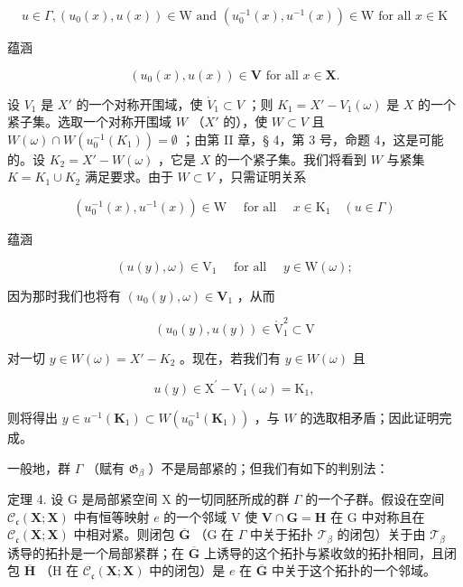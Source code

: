 \[
u \in \Gamma , (u _ {0} (x), u (x)) \in \mathrm{W} \text {   and   } (u _ {0} ^ {- 1} (x), u ^ {- 1} (x)) \in \mathrm{W} \text {   for   all   } x \in \mathrm{K}
\]

蕴涵

\[
(u _ {0} (x), u (x)) \in \mathbf {V} \text {   for   all   } x \in \mathbf {X}.
\]

设 \(V_1\) 是 \(X'\) 的一个对称开围域，使 \(\dot{V}_1 \subset V\) ；则 \(K_1 = X' - V_1(\omega)\) 是 \(X\) 的一个紧子集。选取一个对称开围域 \(W\) （\(X'\) 的），使 \(W \subset V\) 且 \(W(\omega) \cap W(u_0^{-1}(K_1)) = \emptyset\) ；由第 II 章，§ 4，第 3 号，命题 4，这是可能的。设 \(K_2 = X' - W(\omega)\) ，它是 \(X\) 的一个紧子集。我们将看到 \(W\) 与紧集 \(K = K_1 \cup K_2\) 满足要求。由于 \(W \subset V\) ，只需证明关系

\[
\left(u _ {0} ^ {- 1} (x), u ^ {- 1} (x)\right) \in \mathrm{W} \quad \text { for   all } \quad x \in \mathrm{K} _ {1} \quad (u \in \Gamma)
\]

蕴涵

\[
(u (y), \omega) \in \mathrm{V} _ {1} \quad \text { for   all } \quad y \in \mathrm{W} (\omega);
\]

因为那时我们也将有 \((u_0(y),\omega)\in \mathbf{V}_1\) ，从而

\[
(u _ {0} (y), u (y)) \in \mathring {\mathrm{V}} _ {1} ^ {2} \subset \mathrm{V}
\]

对一切 \(y \in W(\omega) = X' - K_2\) 。现在，若我们有 \(y \in W(\omega)\) 且

\[
u (y) \in \mathrm{X} ^ {\prime} - \mathrm{V} _ {1} (\omega) = \mathrm{K} _ {1},
\]

则将得出 \(y \in u^{-1}(\mathbf{K}_1) \subset W(u_0^{-1}(\mathbf{K}_1))\) ，与 \(W\) 的选取相矛盾；因此证明完成。

一般地，群 \(\Gamma\) （赋有 \(\mathfrak{G}_{\beta}\) ）不是局部紧的；但我们有如下的判别法：

定理 4. 设 G 是局部紧空间 X 的一切同胚所成的群 \(\Gamma\) 的一个子群。假设在空间 \(\mathcal{C}_{\mathfrak{c}}(\mathbf{X};\mathbf{X})\) 中有恒等映射 \(e\) 的一个邻域 V 使 \(\mathbf{V}\cap \mathbf{G} = \mathbf{H}\) 在 G 中对称且在 \(\mathcal{C}_{\mathfrak{c}}(\mathbf{X};\mathbf{X})\) 中相对紧。则闭包 \(\overline{\mathbf{G}}\) （G 在 \(\Gamma\) 中关于拓扑 \(\mathcal{T}_{\beta}\) 的闭包）关于由 \(\mathcal{T}_{\beta}\) 诱导的拓扑是一个局部紧群；在 \(\overline{\mathbf{G}}\) 上诱导的这个拓扑与紧收敛的拓扑相同，且闭包 \(\overline{\mathbf{H}}\) （H 在 \(\mathcal{C}_{\mathfrak{c}}(\mathbf{X};\mathbf{X})\) 中的闭包）是 \(e\) 在 \(\overline{\mathbf{G}}\) 中关于这个拓扑的一个邻域。

